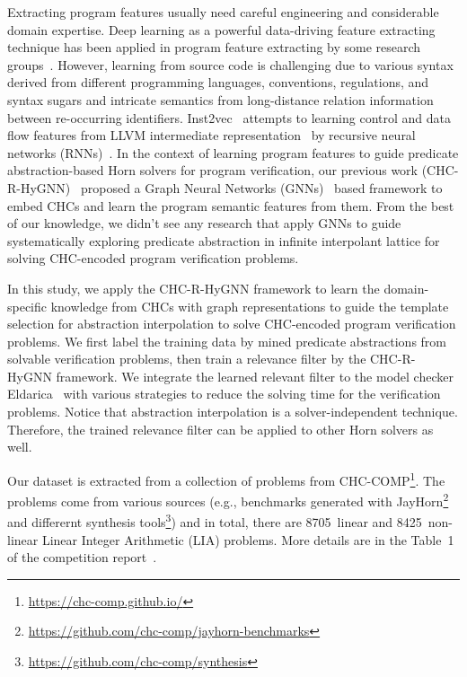 Extracting program features usually need careful engineering and considerable domain expertise. Deep learning as a powerful data-driving feature extracting technique has been applied in program feature extracting by some research groups~\cite{DBLP:journals/corr/abs-1711-00740}.
%
However, learning from source code is challenging due to various syntax derived from different programming languages, conventions, regulations, and syntax sugars and intricate semantics from long-distance relation information between re-occurring identifiers.
%
Inst2vec~\cite{DBLP:journals/corr/abs-1806-07336} attempts to learning control and data flow features from LLVM intermediate representation~\cite{1281665} by recursive neural networks (RNNs)~\cite{Mikolov2010RecurrentNN}.
%
In the context of learning program features to guide predicate abstraction-based Horn solvers for program verification, our previous work (CHC-R-HyGNN)~\cite{tech-report} proposed a Graph Neural Networks (GNNs)~\cite{DBLP:journals/corr/abs-1806-01261} based framework to embed CHCs and learn the program semantic features from them.
%
From the best of our knowledge, we didn't see any research that apply GNNs to guide systematically exploring predicate abstraction in infinite interpolant lattice for solving CHC-encoded program verification problems. 


In this study, we apply the CHC-R-HyGNN framework to learn the domain-specific knowledge from CHCs with graph representations to guide the template selection for abstraction interpolation to solve CHC-encoded program verification problems.
%
We first label the training data by mined predicate abstractions from solvable verification problems, then train a relevance filter by the CHC-R-HyGNN framework.
%
We integrate the learned relevant filter to the model checker Eldarica~\cite{ruemmer2013disjunctive} with various strategies to reduce the solving time for the verification problems. 
%
Notice that abstraction interpolation is a solver-independent technique. Therefore, the trained relevance filter can be applied to other Horn solvers as well.


Our dataset is extracted from a collection of problems from CHC-COMP\footnote{\url{https://chc-comp.github.io/}}. The problems come from various sources (e.g., benchmarks generated with JayHorn\footnote{\url{https://github.com/chc-comp/jayhorn-benchmarks}} and differernt synthesis tools\footnote{\url{https://github.com/chc-comp/synthesis}}) and in total, there are 8705~linear and 8425~non-linear Linear Integer Arithmetic (LIA) problems.
%
More details are in the Table~1 of the competition report~\cite{chcBenchmark}.

